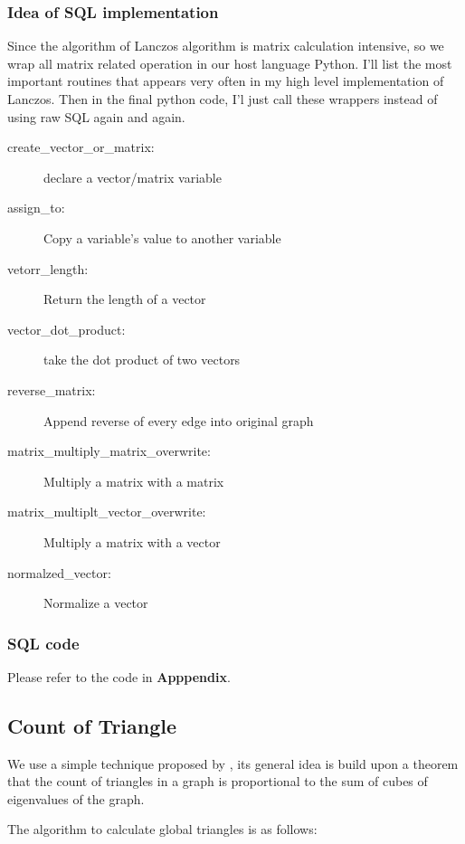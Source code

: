 \subsubsection{Idea of SQL implementation}
Since the algorithm of Lanczos algorithm is matrix calculation intensive, so we wrap all matrix related operation in our host language Python. I'll list the most important routines that appears very often in my high level implementation of Lanczos. Then in the final python code, I'l just call these wrappers instead of using raw SQL again and again.
\begin{description}
  \item[create\_vector\_or\_matrix:]{declare a vector/matrix variable}
  \item[assign\_to:]{Copy a variable's value to another variable}
  \item[vetorr\_length:]{Return the length of a vector}
  \item[vector\_dot\_product:]{take the dot product of two vectors}
  \item[reverse\_matrix:]{Append reverse of every edge into original graph}
  \item[matrix\_multiply\_matrix\_overwrite:]{Multiply a matrix with a matrix}
  \item[matrix\_multiplt\_vector\_overwrite:]{Multiply a matrix with a vector}
  \item[normalzed\_vector:]{Normalize a vector}
\end{description}

\subsubsection{SQL code}
Please refer to the code in {\bf Apppendix}.

\subsection{Count of Triangle}
We use a simple technique proposed by \cite{tsourakakis2008fast}, its general idea is build upon a theorem that the count of triangles in a graph is proportional to the sum of cubes of eigenvalues of the graph. 

The algorithm to calculate global triangles is as follows:

